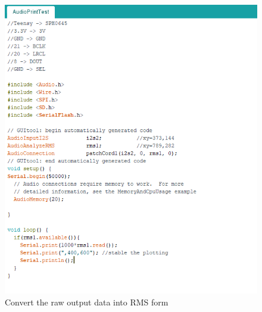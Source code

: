 \begin{figure}[H]
	\centering
	\noindent\includegraphics[width=1\textwidth]{images/RMSS.png}
	\caption{Convert the raw output data into RMS form}
	\label{fig:RMSS}
\end{figure}


